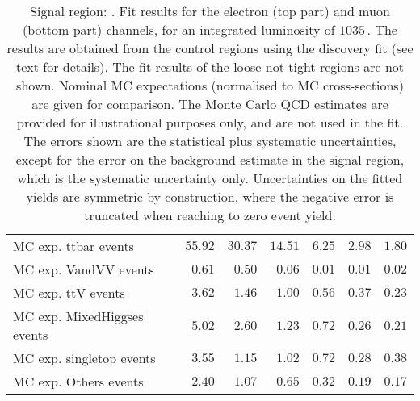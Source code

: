 \begin{table}
\begin{tabular*}{\textwidth}{@{\extracolsep{\fill}}lrrrrrr}
\midrule
        MC exp. ttbar events         & $55.92$          & $30.37$          & $14.51$          & $6.25$          & $2.98$          & $1.80$              \\
        MC exp. VandVV events         & $0.61$          & $0.50$          & $0.06$          & $0.01$          & $0.01$          & $0.02$              \\
        MC exp. ttV events         & $3.62$          & $1.46$          & $1.00$          & $0.56$          & $0.37$          & $0.23$              \\
        MC exp. MixedHiggses events         & $5.02$          & $2.60$          & $1.23$          & $0.72$          & $0.26$          & $0.21$              \\
        MC exp. singletop events         & $3.55$          & $1.15$          & $1.02$          & $0.72$          & $0.28$          & $0.38$              \\
        MC exp. Others events         & $2.40$          & $1.07$          & $0.65$          & $0.32$          & $0.19$          & $0.17$              \\
\bottomrule
\end{tabular*}
\caption{Signal region: . Fit results for the electron (top part) and muon (bottom part) channels, for an integrated luminosity of $1035$\,\ipb.
The results are obtained from the control regions using the discovery fit (see text for details). The fit results of the loose-not-tight regions are not shown.
Nominal MC expectations (normalised to MC cross-sections) are given for comparison. 
The Monte Carlo QCD estimates are provided for illustrational purposes only, and are not used in the fit.
The errors shown are the statistical plus systematic uncertainties, except for the error on the background estimate in the signal region, which is the systematic uncertainty only.
Uncertainties on the fitted yields are symmetric by construction, 
where the negative error is truncated when reaching to zero event yield.
}
\label{table.results.systematics.in.logL.fit.table.results.yields}
\end{table}
%